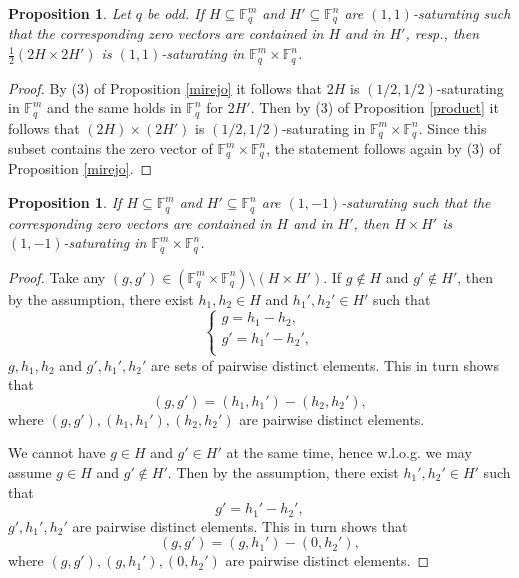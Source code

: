 \documentclass[11pt]{article}
\numberwithin{table}{section}
\newcommand{\F}{{\mathbb F}}
\newtheorem{proposition}[theorem]{Proposition}
\theoremstyle{definition}
\begin{document}
	\begin{proposition}
		Let $q$ be odd. If $H \subseteq \F_q^m$ and $H' \subseteq \F_q^n$ are $(1,1)$-saturating such that the corresponding zero vectors are contained 
		in $H$ and in $H'$, resp.,  then $\frac12(2H \times 2H')$ is $(1,1)$-saturating in $\F_q^m \times \F_q^n$. 
	\end{proposition}
	\begin{proof}
		By (3) of Proposition \ref{mirejo} it follows that $2H$ is $(1/2,1/2)$-saturating in $\F_q^m$ and the same holds in $\F_q^n$ for $2H'$. Then by (3) of Proposition \ref{product} it follows that $(2H)\times (2H')$ is $(1/2,1/2)$-saturating in $\F_q^m \times \F_q^n$. Since this subset contains the zero vector of $\F_q^m \times \F_q^n$, the statement follows again by (3) of Proposition \ref{mirejo}. 
	\end{proof}
	
	\begin{proposition}
		If $H \subseteq \F_q^m$ and $H' \subseteq \F_q^n$ are $(1,-1)$-saturating such that the corresponding zero vectors are contained in $H$ and in $H'$, then $H \times H'$ is $(1,-1)$-saturating in $\F_q^m \times \F_q^n$.  
	\end{proposition}
	\begin{proof}
		Take any $(g,g') \in (\F_q^{m}\times \F_q^{n}) \setminus (H \times H')$. If $g\notin H$ and $g'\notin H'$, then by the assumption, there exist $h_1,h_2 \in H$ and $h_1',h_2' \in H'$ such that
		\begin{equation*}   
			\begin{cases}
				g=h_1-h_2,\\
				g'=h_1'-h_2',\\
			\end{cases}
		\end{equation*}
		$g,h_1,h_2$ and $g',h_1',h_2'$ are sets of pairwise distinct elements.
		This in turn shows that $$(g,g')=(h_1, h_1')-(h_2, h_2'),$$
		where $(g,g'),(h_1,h_1'),(h_2,h_2')$ are pairwise distinct elements. 
		
		We cannot have $g\in H$ and $g'\in H'$ at the same time, hence w.l.o.g. we may assume $g\in H$ and $g'\notin H'$. 
		Then by the assumption, there exist $h_1',h_2' \in H'$ such that
		\[g'=h_1'-h_2',\]
		$g', h_1', h_2'$ are pairwise distinct elements.
		This in turn shows that $$(g,g')=(g, h_1')-(0, h_2'),$$
		where $(g,g'),(g,h_1'),(0,h_2')$ are pairwise distinct elements. 
	\end{proof}
	
\end{document}

